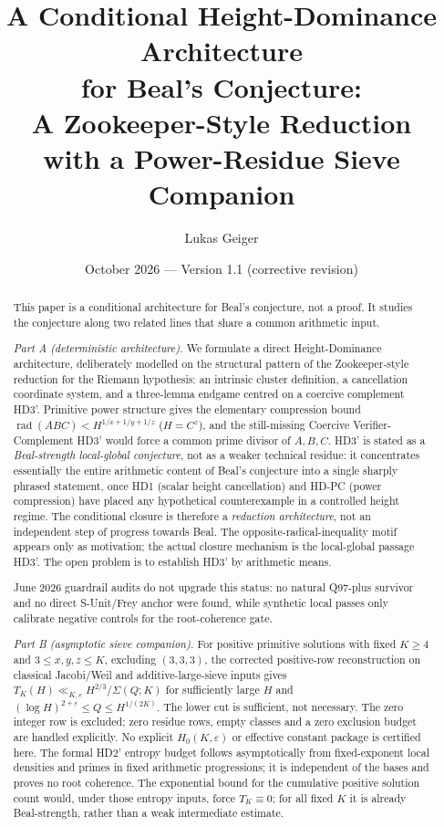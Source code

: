 \documentclass[11pt,a4paper]{article}
\title{A Conditional Height-Dominance Architecture\\
for Beal's Conjecture:\\
A Zookeeper-Style Reduction\\
with a Power-Residue Sieve Companion}
\author{Lukas Geiger}
\date{October 2026 --- Version 1.1 (corrective revision)}
\DeclareMathOperator{\rad}{rad}
\begin{document}
\maketitle

\begin{abstract}
This paper is a conditional architecture for Beal's conjecture, not a
proof. It studies the conjecture along two related lines that share a
common arithmetic input.

\emph{Part A (deterministic architecture).}
We formulate a direct Height-Dominance architecture, deliberately
modelled on the structural pattern of the Zookeeper-style reduction for the
Riemann hypothesis: an intrinsic cluster definition, a cancellation
coordinate system, and a three-lemma endgame centred on a coercive
complement HD3'. Primitive power structure gives the elementary
compression bound $\rad(ABC) < H^{1/x+1/y+1/z}$ ($H=C^z$),
and the still-missing Coercive Verifier-Complement HD3' would force a
common prime divisor of $A,B,C$. HD3' is stated as a
\emph{Beal-strength local-global conjecture}, not as a weaker
technical residue: it concentrates essentially the entire arithmetic
content of Beal's conjecture into a single sharply phrased statement,
once HD1 (scalar height cancellation) and HD-PC (power compression)
have placed any hypothetical counterexample in a controlled height
regime. The conditional closure is therefore a \emph{reduction
architecture}, not an independent step of progress towards Beal. The
opposite-radical-inequality motif appears only as motivation; the
actual closure mechanism is the local-global passage HD3'. The open
problem is to establish HD3' by arithmetic means.

June 2026 guardrail audits do not upgrade this status: no natural
Q97-plus survivor and no direct S-Unit/Frey anchor were found, while
synthetic local passes only calibrate negative controls for the
root-coherence gate.

\emph{Part B (asymptotic sieve companion).}
For positive primitive solutions with fixed $K\ge4$ and $3\le x,y,z\le K$,
excluding $(3,3,3)$, the corrected positive-row reconstruction on
classical Jacobi/Weil and additive-large-sieve inputs gives
$T_K(H)\ll_{K,\varepsilon}H^{2/3}/\Sigma(Q;K)$ for sufficiently large $H$
and $(\log H)^{2+\varepsilon}\le Q\le H^{1/(2K)}$.
The lower cut is sufficient, not necessary. The zero integer row is
excluded; zero residue rows, empty classes and a zero exclusion budget
are handled explicitly. No explicit $H_0(K,\varepsilon)$ or effective
constant package is certified here.
The formal HD2' entropy budget follows asymptotically from fixed-exponent
local densities and primes in fixed arithmetic progressions; it is
independent of the bases and proves no root coherence.
The exponential bound for the cumulative positive solution count would,
under those entropy inputs, force $T_K\equiv0$; for all fixed $K$ it is
already Beal-strength, rather than a weak intermediate estimate.


\end{abstract}
\end{document}
